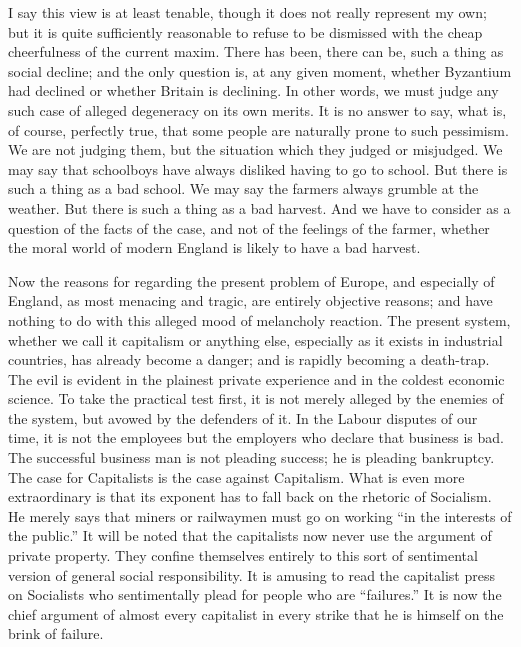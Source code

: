 \documentclass{book}
\begin{document}
I say this view is at least tenable, though it does not really represent my own; but it is quite sufficiently reasonable to refuse to be dismissed with the cheap cheerfulness of the current maxim. There has been, there can be, such a thing as social decline; and the only question is, at any given moment, whether Byzantium had declined or whether Britain is declining. In other words, we must judge any such case of alleged degeneracy on its own merits. It is no answer to say, what is, of course, perfectly true, that some people are naturally prone to such pessimism. We are not judging them, but the situation which they judged or misjudged. We may say that schoolboys have always disliked having to go to school. But there is such a thing as a bad school. We may say the farmers always grumble at the weather. But there is such a thing as a bad harvest. And we have to consider as a question of the facts of the case, and not of the feelings of the farmer, whether the moral world of modern England is likely to have a bad harvest.

Now the reasons for regarding the present problem of Europe, and especially of England, as most menacing and tragic, are entirely objective reasons; and have nothing to do with this alleged mood of melancholy reaction. The present system, whether we call it capitalism or anything else, especially as it exists in industrial countries, has already become a danger; and is rapidly becoming a death-trap. The evil is evident in the plainest private experience and in the coldest economic science. To take the practical test first, it is not merely alleged by the enemies of the system, but avowed by the defenders of it. In the Labour disputes of our time, it is not the employees but the employers who declare that business is bad. The successful business man is not pleading success; he is pleading bankruptcy. The case for Capitalists is the case against Capitalism. What is even more extraordinary is that its exponent has to fall back on the rhetoric of Socialism. He merely says that miners or railwaymen must go on working “in the interests of the public.” It will be noted that the capitalists now never use the argument of private property. They confine themselves entirely to this sort of sentimental version of general social responsibility. It is amusing to read the capitalist press on Socialists who sentimentally plead for people who are “failures.” It is now the chief argument of almost every capitalist in every strike that he is himself on the brink of failure.
\end{document}
